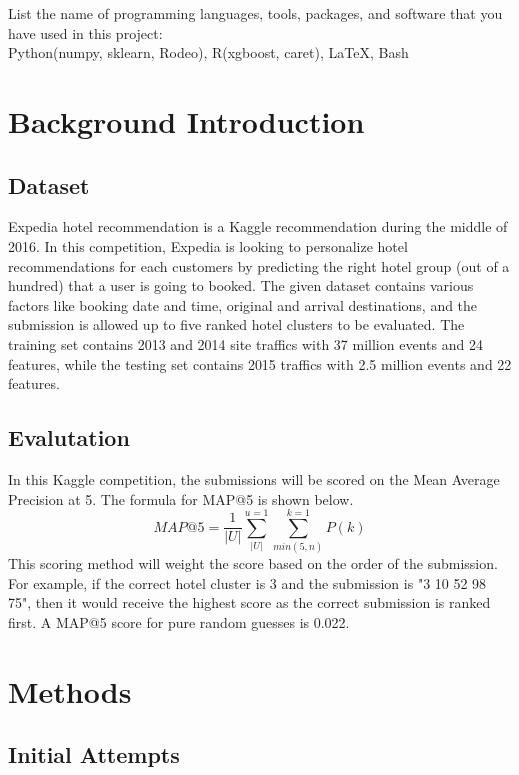 \documentclass[12pt]{report}
\begin{document}
List the name of programming languages, tools, packages, and software that you have used in this project:\\
Python(numpy, sklearn, Rodeo), R(xgboost, caret), \LaTeX, Bash



\setlength{\parindent}{0cm}
\tableofcontents

\chapter{Background Introduction}
\section{Dataset}
Expedia hotel recommendation is a Kaggle recommendation during the middle of 2016. In this competition, Expedia is looking to personalize hotel recommendations for each customers by predicting the right hotel group (out of a hundred) that a user is going to booked. The given dataset contains various factors like booking date and time, original and arrival destinations, and the submission is allowed up to five ranked hotel clusters to be evaluated. The training set contains 2013 and 2014 site traffics with 37 million events and 24 features, while the testing set contains 2015 traffics with 2.5 million events and 22 features.\\ 

\section{Evalutation}
In this Kaggle competition, the submissions will be scored on the Mean Average Precision at 5. The formula for MAP@5 is shown below.
\[MAP@5=\frac{1}{|U|}\sum_{|U|}^{u=1}\sum_{min(5,n)}^{k=1}P(k)\]
This scoring method will weight the score based on the order of the submission. For example, if the correct hotel cluster is 3 and the submission is "3 10 52 98 75", then it would receive the highest score as the correct submission is ranked first. A MAP@5 score for pure random guesses is 0.022.

\chapter{Methods}

\section{Initial Attempts}
\end{document}

